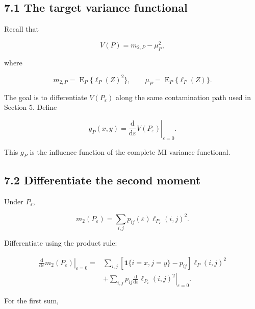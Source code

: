 \documentclass[
  11pt]{article}
\begin{document}
\subsection{7.1 The target variance
functional}\label{the-target-variance-functional}

Recall that

\begin{equation}
V(P)=m_{2,P}-\mu_P^2,
\end{equation}

where

\begin{equation}
m_{2,P}=\operatorname E_P\{\ell_P(Z)^2\},
\qquad
\mu_P=\operatorname E_P\{\ell_P(Z)\}.
\end{equation}

The goal is to differentiate \(V(P_\varepsilon)\) along the same
contamination path used in Section 5. Define

\begin{equation}
g_P(x,y)
=\left.
\frac{\mathrm d}{\mathrm d\varepsilon}V(P_\varepsilon)
\right|_{\varepsilon=0}.
\end{equation}

This \(g_P\) is the influence function of the complete MI variance
functional.

\subsection{7.2 Differentiate the second
moment}\label{differentiate-the-second-moment}

Under \(P_\varepsilon\),

\begin{equation}
m_2(P_\varepsilon)
=\sum_{i,j}p_{ij}(\varepsilon)
\ell_{P_\varepsilon}(i,j)^2.
\end{equation}

Differentiate using the product rule:

\begin{equation}
\begin{aligned}
\left.
\frac{\mathrm d}{\mathrm d\varepsilon}m_2(P_\varepsilon)
\right|_{\varepsilon=0}
={}&\sum_{i,j}
\left[\mathbf 1\{i=x,j=y\}-p_{ij}\right]\ell_P(i,j)^2\\
&+\sum_{i,j}p_{ij}
\left.
\frac{\mathrm d}{\mathrm d\varepsilon}
\ell_{P_\varepsilon}(i,j)^2
\right|_{\varepsilon=0}.
\end{aligned}
\end{equation}

For the first sum,
\end{document}

